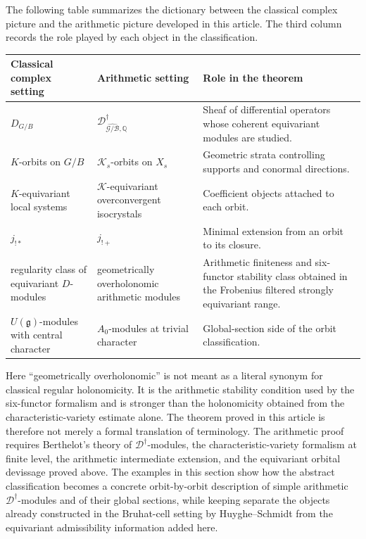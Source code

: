 \documentclass[11pt]{amsart}
\theoremstyle{plain}
\theoremstyle{definition}
\theoremstyle{remark}
\begin{document}
The following table summarizes the dictionary between the classical complex
picture and the arithmetic picture developed in this article. The third
column records the role played by each object in the classification.
\begin{center}
\footnotesize
\renewcommand{\arraystretch}{1.18}
\begin{tabularx}{\textwidth}{@{}>{\raggedright\arraybackslash}p{}
                        >{\raggedright\arraybackslash}p{}
                        >{\raggedright\arraybackslash}X@{}}
\toprule
\textbf{Classical complex setting} &
\textbf{Arithmetic setting} &
\textbf{Role in the theorem} \\
\midrule
\(D_{G/B}\) &
\(\mathscr D^\dagger_{\widehat{\mathcal G/\mathcal B},\mathbb Q}\) &
Sheaf of differential operators whose coherent equivariant modules are studied. \\
\addlinespace[0.35em]
\(K\)-orbits on \(G/B\) &
\(\mathcal K_s\)-orbits on \(X_s\) &
Geometric strata controlling supports and conormal directions. \\
\addlinespace[0.35em]
\(K\)-equivariant local systems &
\(\mathcal K\)-equivariant overconvergent isocrystals &
Coefficient objects attached to each orbit. \\
\addlinespace[0.35em]
\(j_{!*}\) &
\(j_{!+}\) &
Minimal extension from an orbit to its closure. \\
\addlinespace[0.35em]
regularity class of equivariant \(D\)-modules &
geometrically overholonomic arithmetic modules &
Arithmetic finiteness and six-functor stability class obtained in the Frobenius filtered strongly equivariant range. \\
\addlinespace[0.35em]
\(U(\mathfrak g)\)-modules with central character &
\(A_0\)-modules at trivial character &
Global-section side of the orbit classification. \\
\bottomrule
\end{tabularx}
\end{center}
Here ``geometrically overholonomic'' is not meant as a literal synonym for
classical regular holonomicity.  It is the arithmetic stability condition used
by the six-functor formalism and is stronger than the holonomicity obtained
from the characteristic-variety estimate alone.  The theorem proved in this
article is therefore not merely a formal translation of terminology. The arithmetic proof requires Berthelot's theory
of \(\mathscr D^\dagger\)-modules, the characteristic-variety formalism at
finite level, the arithmetic intermediate extension, and the equivariant
orbital devissage proved above. The examples in this section show how the
abstract classification becomes a concrete orbit-by-orbit description of
simple arithmetic \(\mathscr D^\dagger\)-modules and of their global sections,
while keeping separate the objects already constructed in the Bruhat-cell
setting by Huyghe--Schmidt from the equivariant admissibility information added
here.
\end{document}
